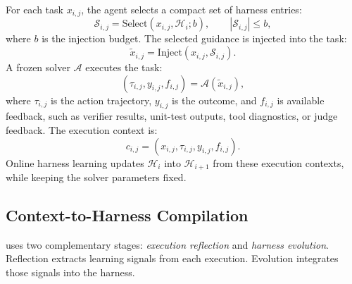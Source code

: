 For each task $x_{i,j}$, the agent selects a compact set of harness entries:
\begin{equation}
    \mathcal{S}_{i,j}
    =
    \mathrm{Select}(x_{i,j}, \mathcal{H}_i; b),
    \qquad
    |\mathcal{S}_{i,j}| \leq b,
\end{equation}
where $b$ is the injection budget. The selected guidance is injected into the task:
\begin{equation}
    \tilde{x}_{i,j}
    =
    \mathrm{Inject}(x_{i,j}, \mathcal{S}_{i,j}).
\end{equation}
A frozen solver $\mathcal{A}$ executes the task:
\begin{equation}
    (\tau_{i,j}, y_{i,j}, f_{i,j})
    =
    \mathcal{A}(\tilde{x}_{i,j}),
\end{equation}
where $\tau_{i,j}$ is the action trajectory, $y_{i,j}$ is the outcome, and $f_{i,j}$ is available feedback, such as verifier results, unit-test outputs, tool diagnostics, or judge feedback. The execution context is:
\begin{equation}
    c_{i,j}
    =
    (x_{i,j}, \tau_{i,j}, y_{i,j}, f_{i,j}).
\end{equation}
Online harness learning updates $\mathcal{H}_i$ into $\mathcal{H}_{i+1}$ from these execution contexts, while keeping the solver parameters fixed.

\subsection{Context-to-Harness Compilation}
\label{sec:method-compilation}

\algname{} uses two complementary stages: \emph{execution reflection} and \emph{harness evolution}. Reflection extracts learning signals from each execution. Evolution integrates those signals into the harness.


